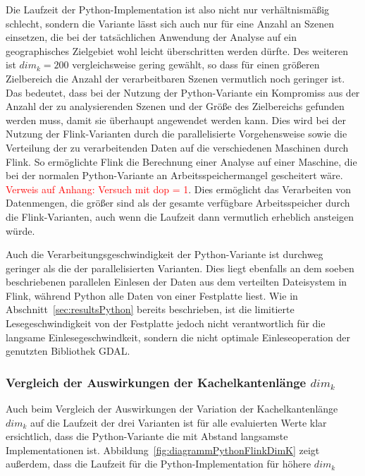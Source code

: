 Die Laufzeit der Python-Implementation ist also nicht nur verhältnismäßig schlecht, sondern die Variante lässt sich auch nur für eine Anzahl an Szenen einsetzen, die bei der tatsächlichen Anwendung der Analyse auf ein geographisches Zielgebiet wohl leicht überschritten werden dürfte. Des weiteren ist $dim_k = 200$ vergleichsweise gering gewählt, so dass für einen größeren Zielbereich die Anzahl der verarbeitbaren Szenen vermutlich noch geringer ist. Das bedeutet, dass bei der Nutzung der Python-Variante ein Kompromiss aus der Anzahl der zu analysierenden Szenen und der Größe des Zielbereichs gefunden werden muss, damit sie überhaupt angewendet werden kann. Dies wird bei der Nutzung der Flink-Varianten durch die parallelisierte Vorgehensweise sowie die Verteilung der zu verarbeitenden Daten auf die verschiedenen Maschinen durch Flink. So ermöglichte Flink die Berechnung einer Analyse auf einer Maschine, die bei der normalen Python-Variante an Arbeitsspeichermangel gescheitert wäre. \textcolor{red}{Verweis auf Anhang: Versuch mit dop = 1}. Dies ermöglicht das Verarbeiten von Datenmengen, die größer sind als der gesamte verfügbare Arbeitsspeicher durch die Flink-Varianten, auch wenn die Laufzeit dann vermutlich erheblich ansteigen würde.

Auch die Verarbeitungsgeschwindigkeit der Python-Variante ist durchweg geringer als die der parallelisierten Varianten. Dies liegt ebenfalls an dem soeben beschriebenen parallelen Einlesen der Daten aus dem verteilten Dateisystem in Flink, während Python alle Daten von einer Festplatte liest. Wie in Abschnitt~\ref{sec:resultsPython} bereits beschrieben, ist die limitierte Lesegeschwindigkeit von der Festplatte jedoch nicht verantwortlich für die langsame Einlesegeschwindkeit, sondern die nicht optimale Einleseoperation der genutzten Bibliothek GDAL. 

\subsubsection{Vergleich der Auswirkungen der Kachelkantenlänge $dim_k$}
Auch beim Vergleich der Auswirkungen der Variation der Kachelkantenlänge $dim_k$ auf die Laufzeit der drei Varianten ist für alle evaluierten Werte klar ersichtlich, dass die Python-Variante die mit Abstand langsamste Implementationen ist. Abbildung~\ref{fig:diagrammPythonFlinkDimK} zeigt außerdem, dass die Laufzeit für die Python-Implementation für höhere $dim_k$ 

